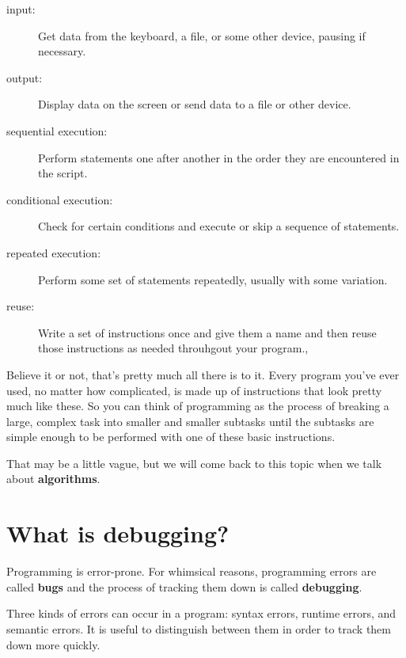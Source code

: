 \documentclass[10pt]{book}
\begin{document}
\begin{description}

\item[input:] Get data from the keyboard, a file, or some
other device, pausing if necessary.

\item[output:] Display data on the screen or send data to a
file or other device.

\item[sequential execution:] Perform statements one after
another in the order they are encountered in the script.

\item[conditional execution:] Check for certain conditions and
execute or skip a sequence of statements.

\item[repeated execution:] Perform some set of statements 
repeatedly, usually with
some variation.

\item[reuse:] Write a set of instructions once and give them a name
and then reuse those instructions as needed throuhgout your program.,

\end{description}

Believe it or not, that's pretty much all there is to it.  Every
program you've ever used, no matter how complicated, is made up of
instructions that look pretty much like these.  So you can think of
programming as the process of breaking a large, complex task
into smaller and smaller subtasks until the subtasks are
simple enough to be performed with one of these basic instructions.


That may be a little vague, but we will come back to this topic
when we talk about {\bf algorithms}.

\section{What is debugging?}

Programming is error-prone.  For whimsical reasons, programming errors
are called {\bf bugs} and the process of tracking them down is called
{\bf debugging}.


Three kinds of errors can occur in a program: syntax errors, runtime 
errors, and semantic errors. It is useful
to distinguish between them in order to track them down more quickly.
\end{document}
